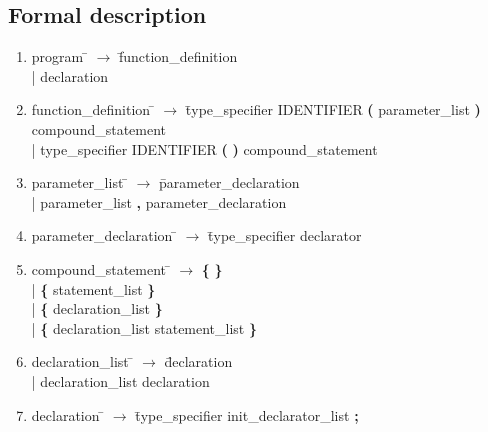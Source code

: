 \documentclass[11pt]{article}
\begin{document}
\subsection{Formal description}
\small
\begin{enumerate}

\item \begin{tabbing} program \= $\to$ \= function{\_}definition \\
	\> | \> declaration
\end{tabbing}

\item \begin{tabbing} function{\_}definition \= $\to$ \= type{\_}specifier IDENTIFIER \textbf{(} parameter{\_}list \textbf{)} compound{\_}statement \\
	\> | \> type{\_}specifier IDENTIFIER \textbf{(} \textbf{)} compound{\_}statement
\end{tabbing}

\item \begin{tabbing} parameter{\_}list \= $\to$ \= parameter{\_}declaration \\
	\> | \> parameter{\_}list \textbf{,} parameter{\_}declaration
\end{tabbing}

\item \begin{tabbing} parameter{\_}declaration \= $\to$ \= type{\_}specifier declarator
\end{tabbing}

\item \begin{tabbing} compound{\_}statement \= $\to$ \= \textbf{\{} \textbf{\}} \\
	\> | \> \textbf{\{} statement{\_}list \textbf{\}} \\
	\> | \> \textbf{\{} declaration{\_}list \textbf{\}} \\
	\> | \> \textbf{\{} declaration{\_}list statement{\_}list \textbf{\}}
\end{tabbing}

\item \begin{tabbing} declaration{\_}list \= $\to$ \= declaration \\
	\> | \> declaration{\_}list declaration
\end{tabbing}

\item \begin{tabbing} declaration \= $\to$ \= type{\_}specifier init{\_}declarator{\_}list \textbf{;}
\end{tabbing}


\end{enumerate}
\end{document}
